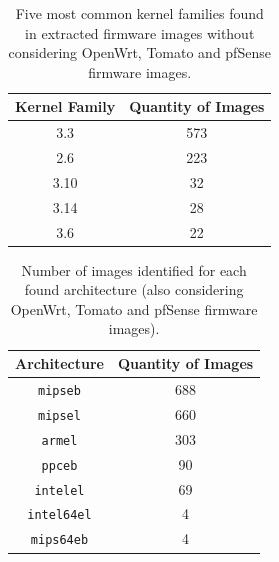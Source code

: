 \begin{table}[H]
\centering
\caption{Five most common kernel families found in extracted firmware images without considering OpenWrt, Tomato and pfSense firmware images.}
\begin{tabular}{|c|c|}
\hline
\textbf{Kernel Family} & \textbf{Quantity of Images} \\ \hline
3.3                     & 573                \\
2.6                     & 223                \\
3.10                    &  32                \\
3.14                    &  28                \\
3.6                     &  22                \\ \hline
\end{tabular}
\label{tab:kernel-family-stats}
\end{table}


\begin{table}[H]
\centering
\caption{Number of images identified for each found architecture (also considering OpenWrt, Tomato and pfSense firmware images).}
\begin{tabular}{|c|c|}
\hline
\textbf{Architecture}       & \textbf{Quantity of Images} \\ \hline
{\tt mipseb}                & 688                         \\
{\tt mipsel}                & 660                         \\
{\tt armel}                 & 303                         \\
{\tt ppceb}                 & 90                          \\
{\tt intelel}               & 69                          \\
{\tt intel64el}             & 4                           \\
{\tt mips64eb}              & 4                           \\ \hline
\end{tabular}
\label{tab:arch-stats-openwrt}
\end{table}

